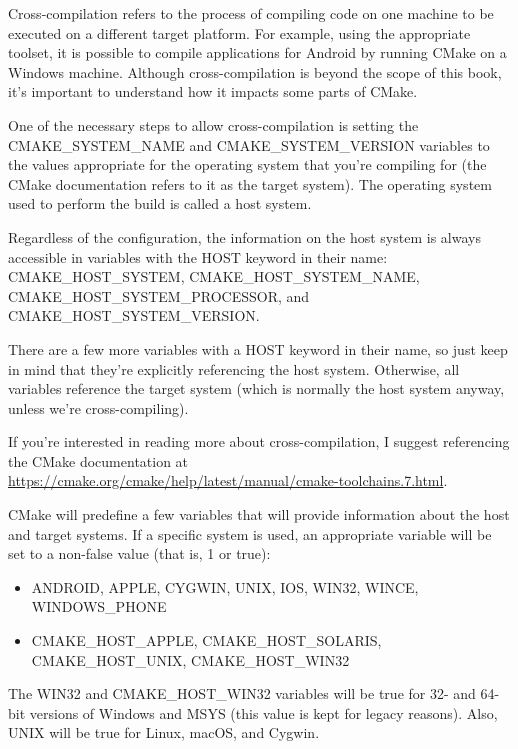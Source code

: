 
Cross-compilation refers to the process of compiling code on one machine to be executed on a different target platform. For example, using the appropriate toolset, it is possible to compile applications for Android by running CMake on a Windows machine. Although cross-compilation is beyond the scope of this book, it’s important to understand how it impacts some parts of CMake.

One of the necessary steps to allow cross-compilation is setting the CMAKE\_SYSTEM\_NAME and CMAKE\_SYSTEM\_VERSION variables to the values appropriate for the operating system that you’re compiling for (the CMake documentation refers to it as the target system). The operating system used to perform the build is called a host system.

Regardless of the configuration, the information on the host system is always accessible in variables with the HOST keyword in their name: CMAKE\_HOST\_SYSTEM, CMAKE\_HOST\_SYSTEM\_NAME, CMAKE\_HOST\_SYSTEM\_PROCESSOR, and CMAKE\_HOST\_SYSTEM\_VERSION.

There are a few more variables with a HOST keyword in their name, so just keep in mind that they’re explicitly referencing the host system. Otherwise, all variables reference the target system (which is normally the host system anyway, unless we’re cross-compiling).

If you’re interested in reading more about cross-compilation, I suggest referencing the CMake documentation at \url{https://cmake.org/cmake/help/latest/manual/cmake-toolchains.7.html}.


CMake will predefine a few variables that will provide information about the host and target systems. If a specific system is used, an appropriate variable will be set to a non-false value (that is, 1 or true):

\begin{itemize}
\item
ANDROID, APPLE, CYGWIN, UNIX, IOS, WIN32, WINCE, WINDOWS\_PHONE

\item
CMAKE\_HOST\_APPLE, CMAKE\_HOST\_SOLARIS, CMAKE\_HOST\_UNIX, CMAKE\_HOST\_WIN32
\end{itemize}

The WIN32 and CMAKE\_HOST\_WIN32 variables will be true for 32- and 64-bit versions of Windows and MSYS (this value is kept for legacy reasons). Also, UNIX will be true for Linux, macOS, and Cygwin.

